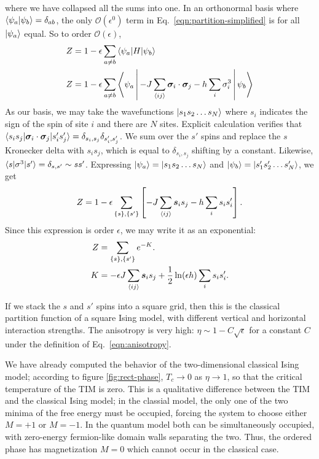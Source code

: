 \documentclass[
  amsmath,
  amssymb,
  aps,
  twocolumn,
  nofootinbib,
  floatfix,
]{revtex4-2}
\newcommand{\brackets}[1]{\left [ #1 \right ]}
\begin{document}
where we have collapsed all the sums into one. In an orthonormal basis where $\braket{\psi_a|\psi_b} = \delta_{ab}$, the only $\mathcal{O}(\epsilon^0)$ term in Eq.~\ref{eqn:partition-simplified} is for all $\ket{\psi_a}$ equal. So to order $\mathcal{O}(\epsilon)$,
\begin{equation}
  \begin{split}
    Z &= 1 - \epsilon\sum_{a\neq b}\braket{\psi_a|H|\psi_b}\\
    Z &= 1 - \epsilon\sum_{a\neq b}\Braket{\psi_a|-J\sum_{\braket{ij}}\bm \sigma_i \cdot \bm \sigma_j - h\sum_i\sigma_i^3|\psi_b}
  \end{split}
\end{equation}
As our basis, we may take the wavefunctions $\ket{s_1 s_2 \dots s_N}$ where $s_i$ indicates the sign of the spin of site $i$ and there are $N$ sites. Explicit calculation verifies that $\braket{s_is_j|\bm \sigma_i \cdot \bm \sigma_j|s_i's_j'}=\delta_{s_i,s_j}\delta_{s'_i,s'_j}$. We sum over the $s'$ spins and replace the $s$ Kronecker delta with $s_i s_j$, which is equal to $\delta_{s_i,s_j}$ shifting by a constant. Likewise, $\braket{s|\sigma^3|s'}=\delta_{s,s'}\sim ss'$. Expressing $\ket{\psi_a}=\ket{s_1 s_2 \dots s_N}$ and $\ket{\psi_b}=\ket{s'_1 s'_2 \dots s'_N}$, we get
\begin{equation}
  Z = 1 - \epsilon\sum_{\{s\},\{s'\}} \brackets{-J\sum_{\braket{ij}}\bm s_is_j - h\sum_is_i s'_i}.
\end{equation}
Since this expression is order $\epsilon$, we may write it as an exponential:
\begin{equation}
  \begin{split}
    Z &= \sum_{\{s\},\{s'\}} e^{-K}.\\
    K &= -\epsilon J\sum_{\braket{ij}}\bm s_is_j +\frac{1}{2}\ln(\epsilon h)\sum_is_i s'_i.
  \end{split}
\end{equation}

If we stack the $s$ and $s'$ spins into a square grid, then this is the classical partition function of a square Ising model, with different vertical and horizontal interaction strengths. The anisotropy is very high: $\eta \sim 1 - C\sqrt{\epsilon}$ for a constant $C$ under the definition of Eq.~\ref{eqn:anisotropy}.

We have already computed the behavior of the two-dimensional classical Ising model; according to figure \ref{fig:rect-phase}, $T_c\rightarrow 0$ as $\eta \rightarrow 1$, so that the critical temperature of the TIM is zero. This is a qualitative difference between the TIM and the classical Ising model; in the classial model, the only one of the two minima of the free energy must be occupied, forcing the system to choose either $M=+1$ or $M=-1$. In the quantum model both can be simultaneously occupied, with zero-energy fermion-like domain walls separating the two. Thus, the ordered phase has magnetization $M=0$ which cannot occur in the classical case.
\end{document}
